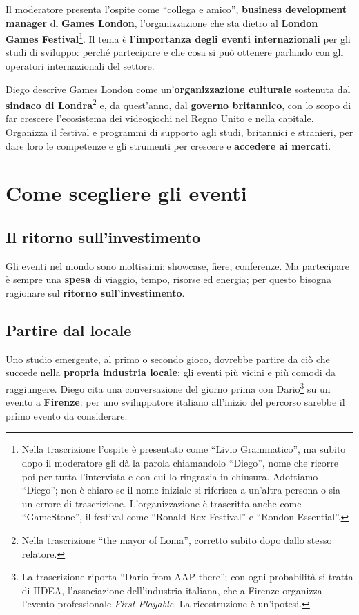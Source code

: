 Il moderatore presenta l'ospite come ``collega e amico'', \textbf{business
development manager} di \textbf{Games London}, l'organizzazione che sta dietro al
\textbf{London Games Festival}\footnote{Nella trascrizione l'ospite è presentato
come ``Livio Grammatico'', ma subito dopo il moderatore gli dà la parola chiamandolo
``Diego'', nome che ricorre poi per tutta l'intervista e con cui lo ringrazia in
chiusura. Adottiamo ``Diego''; non è chiaro se il nome iniziale si riferisca a
un'altra persona o sia un errore di trascrizione. L'organizzazione è trascritta
anche come ``GameStone'', il festival come ``Ronald Rex Festival'' e ``Rondon
Essential''.}. Il tema è \textbf{l'importanza degli eventi internazionali} per gli
studi di sviluppo: perché partecipare e che cosa si può ottenere parlando con gli
operatori internazionali del settore.

Diego descrive Games London come un'\textbf{organizzazione culturale} sostenuta dal
\textbf{sindaco di Londra}\footnote{Nella trascrizione ``the mayor of Loma'',
corretto subito dopo dallo stesso relatore.} e, da quest'anno, dal \textbf{governo
britannico}, con lo scopo di far crescere l'ecosistema dei videogiochi nel Regno
Unito e nella capitale. Organizza il festival e programmi di supporto agli studi,
britannici e stranieri, per dare loro le competenze e gli strumenti per crescere e
\textbf{accedere ai mercati}.

\section{Come scegliere gli eventi}
\label{sec:c3-1-scegliere}

\subsection{Il ritorno sull'investimento}

Gli eventi nel mondo sono moltissimi: showcase, fiere, conferenze. Ma partecipare è
sempre una \textbf{spesa} di viaggio, tempo, risorse ed energia; per questo bisogna
ragionare sul \textbf{ritorno sull'investimento}.

\subsection{Partire dal locale}

Uno studio emergente, al primo o secondo gioco, dovrebbe partire da ciò che succede
nella \textbf{propria industria locale}: gli eventi più vicini e più comodi da
raggiungere. Diego cita una conversazione del giorno prima con
Dario\footnote{La trascrizione riporta ``Dario from AAP there''; con ogni
probabilità si tratta di IIDEA, l'associazione dell'industria italiana, che a
Firenze organizza l'evento professionale \emph{First Playable}. La ricostruzione è
un'ipotesi.} su un evento a \textbf{Firenze}: per uno sviluppatore italiano
all'inizio del percorso sarebbe il primo evento da considerare.

